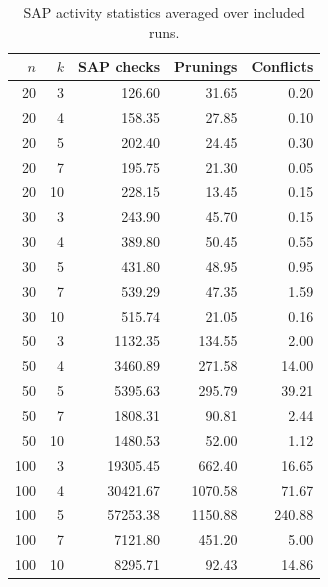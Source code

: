 \begin{table}[t]
\centering
\caption{SAP activity statistics averaged over included runs.}
\label{tab:sap_activity}
\begin{tabular}{rrrrr}
\hline
$n$ & $k$ & SAP checks & Prunings & Conflicts \\
\hline
20 & 3 & 126.60 & 31.65 & 0.20 \\
20 & 4 & 158.35 & 27.85 & 0.10 \\
20 & 5 & 202.40 & 24.45 & 0.30 \\
20 & 7 & 195.75 & 21.30 & 0.05 \\
20 & 10 & 228.15 & 13.45 & 0.15 \\
30 & 3 & 243.90 & 45.70 & 0.15 \\
30 & 4 & 389.80 & 50.45 & 0.55 \\
30 & 5 & 431.80 & 48.95 & 0.95 \\
30 & 7 & 539.29 & 47.35 & 1.59 \\
30 & 10 & 515.74 & 21.05 & 0.16 \\
50 & 3 & 1132.35 & 134.55 & 2.00 \\
50 & 4 & 3460.89 & 271.58 & 14.00 \\
50 & 5 & 5395.63 & 295.79 & 39.21 \\
50 & 7 & 1808.31 & 90.81 & 2.44 \\
50 & 10 & 1480.53 & 52.00 & 1.12 \\
100 & 3 & 19305.45 & 662.40 & 16.65 \\
100 & 4 & 30421.67 & 1070.58 & 71.67 \\
100 & 5 & 57253.38 & 1150.88 & 240.88 \\
100 & 7 & 7121.80 & 451.20 & 5.00 \\
100 & 10 & 8295.71 & 92.43 & 14.86 \\
\hline
\end{tabular}
\end{table}

